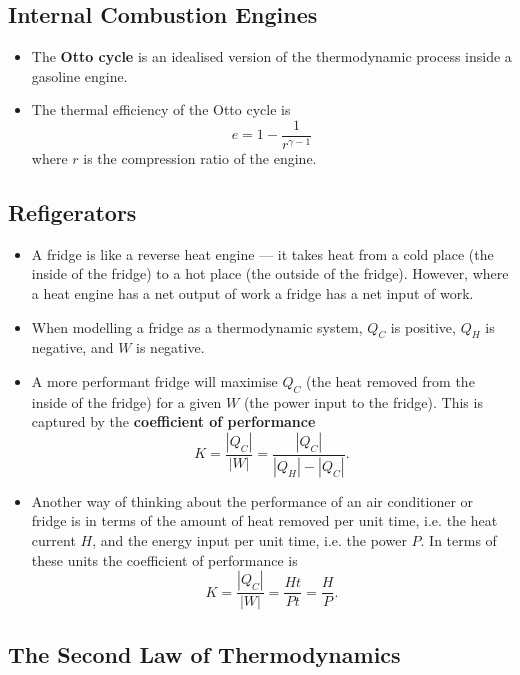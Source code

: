 \documentclass{article}
\begin{document}
\subsection{Internal Combustion Engines}

\begin{itemize}
  \item The \textbf{Otto cycle} is an idealised version of the thermodynamic process inside a gasoline engine.

  \item The thermal efficiency of the Otto cycle is \[e = 1- \frac{1}{r^{\gamma - 1}}\] where $r$ is the compression ratio of the engine.
\end{itemize}

\subsection{Refigerators}

\begin{itemize}
  \item A fridge is like a reverse heat engine — it takes heat from a cold place (the inside of the fridge) to a hot place (the outside of the fridge). However, where a heat engine has a net output of work a fridge has a net input of work.

  \item When modelling a fridge as a thermodynamic system, $Q_C$ is positive, $Q_H$ is negative, and $W$ is negative.

  \item A more performant fridge will maximise $Q_C$ (the heat removed from the inside of the fridge) for a given $W$ (the power input to the fridge). This is captured by the \textbf{coefficient of performance} \[K = \frac{|Q_C|}{|W|} = \frac{|Q_C|}{|Q_H| - |Q_C|}.\]

  \item Another way of thinking about the performance of an air conditioner or fridge is in terms of the amount of heat removed per unit time, i.e. the heat current $H$, and the energy input per unit time, i.e. the power $P$. In terms of these units the coefficient of performance is \[K = \frac{|Q_C|}{|W|} = \frac{H t}{P t} = \frac{H}{P}.\]
\end{itemize}

\subsection{The Second Law of Thermodynamics}
\end{document}
